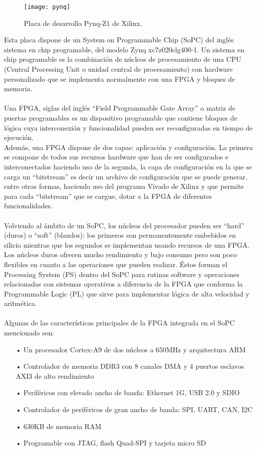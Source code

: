 \begin{figure}[H]
\centering
\texttt{[image: pynq]}
  \caption{Placa de desarrollo Pynq-Z1 de Xilinx.}\label{fig:pynq}
\end{figure}

Esta placa dispone de un System on Programmable Chip (SoPC) del inglés sistema en chip programable, del modelo Zynq xc7z020clg400-1. Un sistema en chip programable es la combinación de núcleos de procesamiento de una CPU (Central Processing Unit o unidad central de procesamiento) con hardware personalizado que se implementa normalmente con una FPGA y bloques de memoria.
\\
\\
Una FPGA, siglas del inglés ``Field Programmable Gate Array'' o matriz de puertas programables es un dispositivo programable que contiene bloques de lógica cuya interconexión y funcionalidad pueden ser reconfiguradas en tiempo de ejecución.
\\
Además, una FPGA dispone de dos capas: aplicación y configuración. La primera se compone de todos sus recursos hardware que han de ser configurados e interconectados haciendo uso de la segunda, la capa de configuración en la que se carga un ``bitstream'' es decir un archivo de configuración que se puede generar, entre otras formas, haciendo uso del programa Vivado de Xilinx y que permite para cada ``bitstream'' que se cargue, dotar a la FPGA de diferentes funcionalidades.
\\
\\
Volviendo al ámbito de un SoPC, los núcleos del procesador pueden ser ``hard'' (duros) o ``soft'' (blandos): los primeros son permanentemente embebidos en silicio mientras que los segundos se implementan usando recursos de una FPGA. 
\\
Los núcleos duros ofrecen mucho rendimiento y bajo consumo pero son poco flexibles en cuanto a las operaciones que pueden realizar. Éstos forman el Processing System (PS) dentro del SoPC para rutinas software y operaciones relacionadas con sistemas operativos a diferencia de la FPGA que conforma la Programmable Logic (PL) que sirve para implementar lógica de alta velocidad y aritmética.
\\
\\
Algunas de las características principales de la FPGA integrada en el SoPC mencionado son:

\begin{itemize}
\item[•] Un procesador Cortex-A9 de dos núcleos a 650MHz y arquitectura ARM
\item[•] Controlador de memoria DDR3 con 8 canales DMA y 4 puertos esclavos AXI3 de alto rendimiento
\item[•] Periféricos con elevado ancho de banda: Ethernet 1G, USB 2.0 y SDIO 
\item[•] Controlador de periféricos de gran ancho de banda: SPI, UART, CAN, I2C
\item[•] 630KB de memoria RAM
\item[•] Programable con JTAG, flash Quad-SPI y tarjeta micro SD
\end{itemize}



